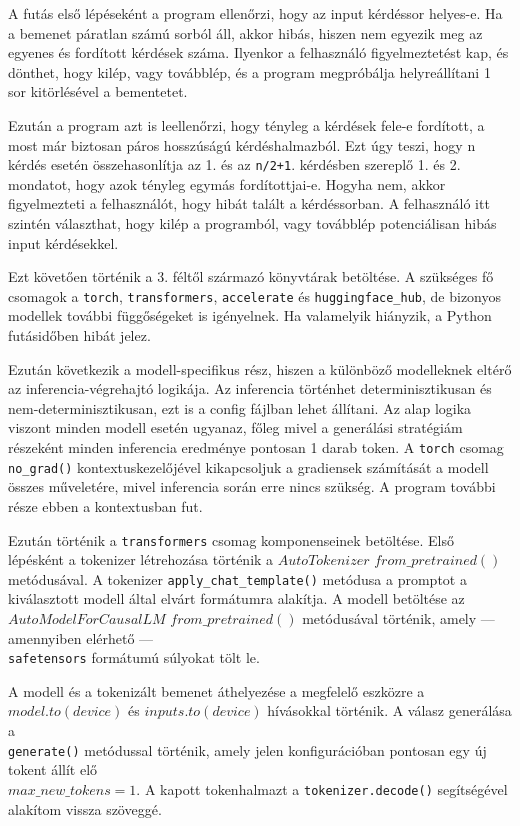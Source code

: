 \documentclass[12pt]{report}
\begin{document}
A futás első lépéseként a program ellenőrzi, hogy az input kérdéssor helyes-e. Ha a bemenet páratlan számú sorból áll, akkor hibás, hiszen nem egyezik meg az egyenes és fordított kérdések száma. Ilyenkor a felhasználó figyelmeztetést kap, és dönthet, hogy kilép, vagy továbblép, és a program megpróbálja helyreállítani 1 sor kitörlésével a bementetet.

Ezután a program azt is leellenőrzi, hogy tényleg a kérdések fele-e fordított, a most már biztosan páros hosszúságú kérdéshalmazból. Ezt úgy teszi, hogy n kérdés esetén összehasonlítja az 1. és az \texttt{\allowbreak n/2+1}. kérdésben szereplő 1. és 2. mondatot, hogy azok tényleg egymás fordítottjai-e. Hogyha nem, akkor figyelmezteti a felhasználót, hogy hibát talált a kérdéssorban. A felhasználó itt szintén választhat, hogy kilép a programból, vagy továbblép potenciálisan hibás input kérdésekkel.

Ezt követően történik a 3. féltől származó könyvtárak betöltése. A szükséges fő csomagok a \texttt{\allowbreak torch}, \texttt{\allowbreak transformers}, \texttt{\allowbreak accelerate} és \texttt{\allowbreak huggingface\_hub}, de bizonyos modellek további függőségeket is igényelnek. Ha valamelyik hiányzik, a Python futásidőben hibát jelez.

Ezután következik a modell-specifikus rész, hiszen a különböző modelleknek eltérő az inferencia-végrehajtó logikája. Az inferencia történhet determinisztikusan és nem-determinisztikusan, ezt is a config fájlban lehet állítani. Az alap logika viszont minden modell esetén ugyanaz, főleg mivel a generálási stratégiám részeként minden inferencia eredménye pontosan 1 darab token.
A \texttt{\allowbreak torch} csomag \texttt{\allowbreak no\_grad()} kontextuskezelőjével kikapcsoljuk a gradiensek számítását a modell összes műveletére, mivel inferencia során erre nincs szükség. A program további része ebben a kontextusban fut.

Ezután történik a \texttt{\allowbreak transformers} csomag komponenseinek betöltése. Első lépésként a tokenizer létrehozása történik a $AutoTokenizer$ $from\_pretrained()$ metódusával. A tokenizer \texttt{\allowbreak apply\_chat\_template()} metódusa a promptot a kiválasztott modell által elvárt formátumra alakítja. A modell betöltése az $AutoModelForCausalLM$ $from\_pretrained()$ metódusával történik, amely — amennyiben elérhető —\\ \texttt{\allowbreak safetensors} formátumú súlyokat tölt le.

A modell és a tokenizált bemenet áthelyezése a megfelelő eszközre a\\ $model.to(device)$ és $inputs.to(device)$ hívásokkal történik. A válasz generálása a\\ \texttt{\allowbreak generate()} metódussal történik, amely jelen konfigurációban pontosan egy új tokent állít elő\\ $max\_new\_tokens=1$. A kapott tokenhalmazt a \texttt{\allowbreak tokenizer.decode()} segítségével alakítom vissza szöveggé.
\end{document}
